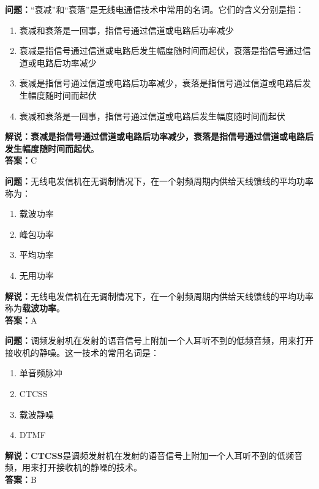 \textbf{问题：}“衰减”和“衰落”是无线电通信技术中常用的名词。它们的含义分别是指：

\begin{enumerate}[label=\Alph*), leftmargin=1.5cm]
	\item 衰减和衰落是一回事，指信号通过信道或电路后功率减少
	\item 衰减是指信号通过信道或电路后发生幅度随时间而起伏，衰落是指信号通过信道或电路后功率减少
	\item 衰减是指信号通过信道或电路后功率减少，衰落是指信号通过信道或电路后发生幅度随时间而起伏
	\item 衰减和衰落是一回事，指信号通过信道或电路后发生幅度随时间而起伏
\end{enumerate}

\textbf{解说：}\textbf{衰减是指信号通过信道或电路后功率减少，衰落是指信号通过信道或电路后发生幅度随时间而起伏}。\\\textbf{答案：}C%



\textbf{问题：}无线电发信机在无调制情况下，在一个射频周期内供给天线馈线的平均功率称为：

\begin{enumerate}[label=\Alph*), leftmargin=1.5cm]
	\item 载波功率
	\item 峰包功率
	\item 平均功率
	\item 无用功率
\end{enumerate}

\textbf{解说：}无线电发信机在无调制情况下，在一个射频周期内供给天线馈线的平均功率称为\textbf{载波功率}。\\\textbf{答案：}A%



\textbf{问题：}调频发射机在发射的语音信号上附加一个人耳听不到的低频音频，用来打开接收机的静噪。这一技术的常用名词是：

\begin{enumerate}[label=\Alph*), leftmargin=1.5cm]
	\item 单音频脉冲
	\item CTCSS
	\item 载波静噪
	\item DTMF
\end{enumerate}

\textbf{解说：}\textbf{CTCSS}是调频发射机在发射的语音信号上附加一个人耳听不到的低频音频，用来打开接收机的静噪的技术。\\\textbf{答案：}B%




